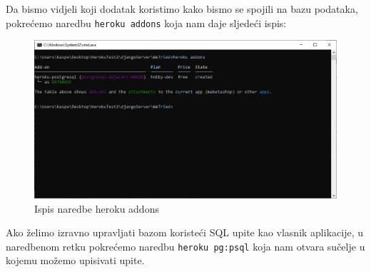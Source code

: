 {			Da bismo vidjeli koji dodatak koristimo kako bismo se spojili na bazu podataka, pokrećemo naredbu \verb|heroku addons| koja nam daje sljedeći ispis:
			\begin{figure}[H]
				\centering
				\includegraphics[width=1\linewidth]{slike/herokuPostgresql}
				\caption{Ispis naredbe heroku addons}
				\label{fig:herokuaddons}
			\end{figure}
			
			Ako želimo izravno upravljati bazom koristeći SQL upite kao vlasnik aplikacije, u naredbenom retku pokrećemo naredbu \verb|heroku pg:psql| koja nam otvara sučelje u kojemu možemo upisivati upite.
			
}
